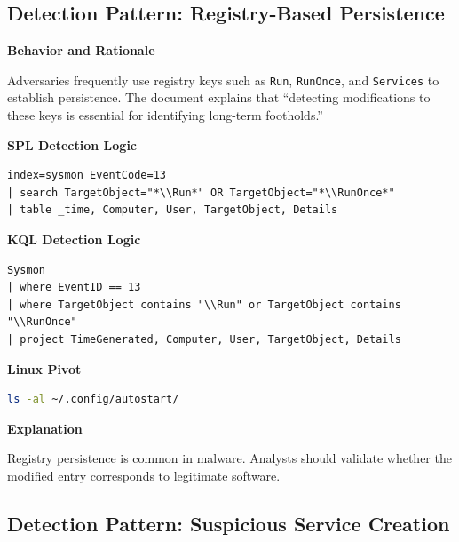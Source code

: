 
\subsection*{Detection Pattern: Registry-Based Persistence}

\textbf{Behavior and Rationale}

Adversaries frequently use registry keys such as \texttt{Run}, \texttt{RunOnce}, and \texttt{Services} to establish persistence. 
The document explains that “detecting modifications to these keys is essential for identifying long-term footholds.”

\textbf{SPL Detection Logic}

\begin{lstlisting}
index=sysmon EventCode=13
| search TargetObject="*\\Run*" OR TargetObject="*\\RunOnce*"
| table _time, Computer, User, TargetObject, Details
\end{lstlisting}

\textbf{KQL Detection Logic}

\begin{lstlisting}
Sysmon
| where EventID == 13
| where TargetObject contains "\\Run" or TargetObject contains "\\RunOnce"
| project TimeGenerated, Computer, User, TargetObject, Details
\end{lstlisting}

\textbf{Linux Pivot}

\begin{lstlisting}[language=bash]
ls -al ~/.config/autostart/
\end{lstlisting}

\textbf{Explanation}

Registry persistence is common in malware. Analysts should validate whether the modified entry corresponds to legitimate software.


\subsection*{Detection Pattern: Suspicious Service Creation}

